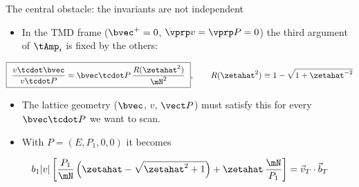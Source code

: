 \begin{frame}{The central obstacle: the invariants are not independent}
  \begin{itemize}
    \item In the TMD frame ($\bvec^+=0$, $\vprp v = \vprp P = 0$) the third argument of $\tAmp_i$ is fixed by the others:
  \end{itemize}
  \begin{block}{}
  \[ \boxed{\ \frac{v \tcdot \bvec}{v \tcdot P} = \bvec \tcdot P\, \frac{R(\zetahat^2)}{\mN^2}\ }, \qquad R(\zetahat^2) \equiv 1- \sqrt{1 + \zetahat^{-2}} \]
  \end{block}
  \begin{itemize}
    \item The lattice geometry ($\bvec$, $v$, $\vect P$) must satisfy this for every $\bvec\tcdot P$ we want to scan.
    \item With $P = (E, P_1, 0, 0)$ it becomes
  \end{itemize}
  \[ b_{1}|v|\left[\frac{P_{1}}{\mN}\left(\zetahat-\sqrt{\zetahat^2+1}\right)+\zetahat\,\frac{\mN}{P_{1}}\right]=\vec{v}_{T}\cdot\vec{b}_{T} \]
\end{frame}

